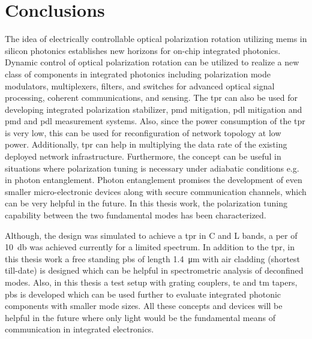 \documentclass[../report.tex]{subfiles}
\begin{document}
		
\chapter{Conclusions}

The idea of electrically controllable optical polarization rotation utilizing \gls{mems} in silicon photonics establishes new horizons for on-chip integrated photonics. Dynamic control of optical polarization rotation can be utilized to realize a new class of components in integrated photonics including polarization mode modulators, multiplexers, filters, and switches for advanced optical signal processing, coherent communications, and sensing. The \gls{tpr} can also be used for developing integrated polarization stabilizer, \gls{pmd} mitigation, \gls{pdl} mitigation and \gls{pmd} and \gls{pdl} measurement systems. Also, since the power consumption of the \gls{tpr} is very low, this can be used for reconfiguration of network topology at low power. Additionally, \gls{tpr} can help in multiplying the data rate of the existing deployed network infrastructure. Furthermore, the concept can be useful in situations where polarization tuning is necessary under adiabatic conditions e.g. in photon entanglement. Photon entanglement promises the development of even smaller micro-electronic devices along with secure communication channels, which can be very helpful in the future. In this thesis work, the polarization tuning capability between the two fundamental modes has been characterized. \par

Although, the design was simulated to achieve a \gls{tpr} in C and L bands, a \gls{per} of \SI{10}{\decibel} was achieved currently for a limited spectrum. In addition to the \gls{tpr}, in this thesis work a free standing \gls{pbs} of length \SI{1.4}{\micro \meter} with air cladding (shortest till-date) is designed which can be helpful in spectrometric analysis of deconfined modes. Also, in this thesis a test setup with grating couplers, \gls{te} and \gls{tm} tapers, \gls{pbs} is developed which can be used further to evaluate integrated photonic components with smaller mode sizes. All these concepts and devices will be helpful in the future where only light would be the fundamental means of communication in integrated electronics.
\end{document}

